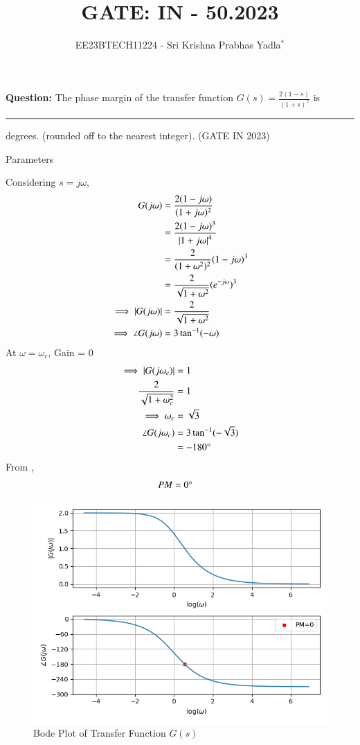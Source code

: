 \documentclass[journal,12pt,twocolumn]{IEEEtran}
\theoremstyle{remark}
\begin{document}

\vspace{3cm}

\title{GATE: IN - 50.2023}
\author{EE23BTECH11224 - Sri Krishna Prabhas Yadla$^{*}$%
}
\maketitle
\newpage
\bigskip

\renewcommand{\thefigure}{\arabic{figure}}
\renewcommand{\thetable}{\arabic{table}}


\vspace{3cm}
\textbf{Question:} The phase margin of the transfer function $G(s) = \frac{2(1-s)}{(1+s)^2}$ is \rule{1cm}{0.15mm} degrees. (rounded off to the nearest integer). \hfill (GATE IN 2023)\\
\solution
\begin{table}[htbp]
	\centering
	\def\arraystrech{1.5}
	
	\caption{Parameters}
	\label{tab:parameters}
\end{table}
\newline
Considering $s=j\omega$,
\begin{align}
	G(j\omega) &= \frac{2(1-j\omega)}{(1+j\omega)^2} \\
	&= \frac{2(1-j\omega)^3}{\left\vert1+j\omega\right\vert^4}\\
	&= \frac{2}{(1+\omega^2)^2}(1-j\omega)^3 \\
	&= \frac{2}{\sqrt{1+\omega^2}}(e^{-j\omega})^3 \\
	\implies \left\vert G(j\omega)\right\vert &= \frac{2}{\sqrt{1+\omega^2}} \\
	\implies \angle G(j\omega) &= 3\tan^{-1}(-\omega)
\end{align}
At $\omega = \omega_c$, Gain = 0
\begin{align}
	\implies \left\vert G(j\omega_c)\right\vert &= 1 \\
	\frac{2}{\sqrt{1+\omega_c^2}} &= 1 \\
	\implies \omega_c &= \sqrt{3} \\
	\angle G(j\omega_c) &= 3\tan^{-1}(-\sqrt{3}) \\
	&= -180\degree
\end{align}
From ,
\begin{align}
	PM &= 0\degree
\end{align}
\begin{figure}[htbp]
	\includegraphics[width=\columnwidth]{figs/bode.png}
	\caption{Bode Plot of Transfer Function $G(s)$}
	\label{fig:bode}
\end{figure}
\end{document}

